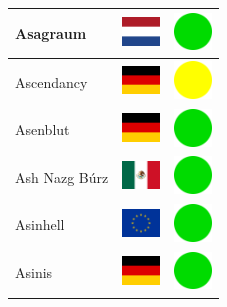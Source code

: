 \documentclass[12pt, a4paper, twoside]{report}
\begin{document}
\begin{center}
\begin{longtable}{|p{5cm}|p{2cm}|p{2cm}|}
 Asagraum                                                   & \includegraphics[width=1cm]{../img/flags/nl} &   \includegraphics[width=1cm]{../likes/y} \\ \hline
 Ascendancy                                                 & \includegraphics[width=1cm]{../img/flags/de} &   \includegraphics[width=1cm]{../likes/m} \\ \hline
 Asenblut                                                   & \includegraphics[width=1cm]{../img/flags/de} &   \includegraphics[width=1cm]{../likes/y} \\ \hline
 Ash Nazg Búrz                                              & \includegraphics[width=1cm]{../img/flags/mx} &   \includegraphics[width=1cm]{../likes/y} \\ \hline
 Asinhell                                                   & \includegraphics[width=1cm]{../img/flags/eu} &   \includegraphics[width=1cm]{../likes/y} \\ \hline
 Asinis                                                     & \includegraphics[width=1cm]{../img/flags/de} &   \includegraphics[width=1cm]{../likes/y} \\ \hline

\end{longtable}
\end{center}
\end{document}
